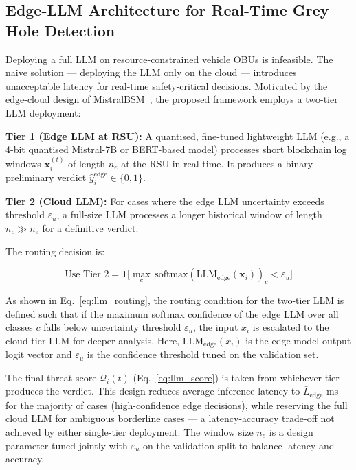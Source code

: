 \documentclass[12pt, a4paper]{report}
\begin{document}
\subsection{Edge-LLM Architecture for Real-Time Grey Hole Detection}

Deploying a full LLM on resource-constrained vehicle OBUs is infeasible.
The naive solution — deploying the LLM only on the cloud — introduces
unacceptable latency for real-time safety-critical decisions. Motivated
by the edge-cloud design of MistralBSM~\cite{hamhoum2024mistralbsm},
the proposed framework employs a two-tier LLM deployment:

\textbf{Tier 1 (Edge LLM at RSU):} A quantised, fine-tuned lightweight
LLM (e.g., a 4-bit quantised Mistral-7B or BERT-based model) processes
short blockchain log windows $\mathbf{x}_i^{(t)}$ of length $n_e$ at the
RSU in real time. It produces a binary preliminary verdict
$\hat{y}_i^{\mathrm{edge}} \in \{0,1\}$.

\textbf{Tier 2 (Cloud LLM):} For cases where the edge LLM uncertainty
exceeds threshold $\varepsilon_u$, a full-size LLM processes a longer
historical window of length $n_c \gg n_e$ for a definitive verdict.

The routing decision is:

\begin{equation}
\label{eq:llm_routing}
\text{Use Tier 2} =
\mathbf{1}\bigl[
\max_c \,\mathrm{softmax}(\mathrm{LLM}_{\mathrm{edge}}(\mathbf{x}_i))_c < \varepsilon_u
\bigr]
\end{equation}

As shown in Eq.~\eqref{eq:llm_routing}, the routing condition for the two-tier LLM is defined such that if the maximum softmax confidence of the edge LLM over all classes $c$ falls below uncertainty threshold $\varepsilon_u$, the input $x_i$ is escalated to the cloud-tier LLM for deeper analysis. Here, $\text{LLM}_{\text{edge}}(x_i)$ is the edge model output logit vector and $\varepsilon_u$ is the confidence threshold tuned on the validation set.



The final threat score $\mathcal{Q}_i(t)$ (Eq.~\eqref{eq:llm_score}) is
taken from whichever tier produces the verdict. This design reduces average
inference latency to $\bar{L}_{\mathrm{edge}}$ ms for the majority of cases
(high-confidence edge decisions), while reserving the full cloud LLM for
ambiguous borderline cases — a latency-accuracy trade-off not achieved by
either single-tier deployment. The window size $n_e$ is a design parameter
tuned jointly with $\varepsilon_u$ on the validation split to balance
latency and accuracy.
\end{document}
